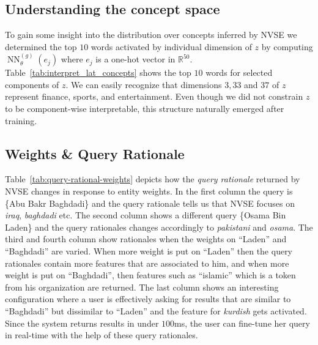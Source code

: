 \documentclass[a4paper]{article}
\newcommand{\tabref}[1]{Table~\ref{#1}}
\DeclareMathOperator{\NN}{NN}
\newcommand{\gennn}{\NN^{(g)}_\theta}
\newcommand{\nvge}{NVSE\xspace}
\begin{document}
\subsection{Understanding the concept space} %
To gain some insight into the distribution over concepts inferred by \nvge we determined the top $10$ words activated by individual dimension of $z$ by computing $\gennn(e_j)$ where $e_j$ is a one-hot vector in $\mathbb{R}^{50}$. %
\tabref{tab:interpret_lat_concepts} shows the top $10$ words for selected components of $z$. We can easily recognize that dimensions $3,33$ and $37$ of $z$ represent finance, sports, and entertainment. Even though we did not constrain $z$ to be component-wise interpretable, this structure naturally emerged after training.

\subsection{Weights \& Query Rationale}
\tabref{tab:query-rational-weights} depicts how the \textit{query rationale} returned by \nvge changes in response to entity weights. In the first column the query is \{Abu Bakr Baghdadi\} and the query rationale tells us that \nvge focuses on \textit{iraq}, \textit{baghdadi} etc. The second column shows a different query \{Osama Bin Laden\} and the query rationales changes accordingly to \textit{pakistani} and \textit{osama}. The third and fourth column show rationales when the weights on ``Laden'' and ``Baghdadi'' are varied. When more weight is put on ``Laden'' then the query rationales contain more features that are associated to him, and when more weight is put on ``Baghdadi'', then features such as ``islamic'' which is a token from his organization are returned. The last column shows an interesting configuration where a user is effectively asking for results that are similar to ``Baghdadi'' but dissimilar to ``Laden'' and the feature for \textit{kurdish} gets activated. Since the system returns results in under $100$ms, the user can fine-tune her query in real-time with the help of these query rationales.
\end{document}
